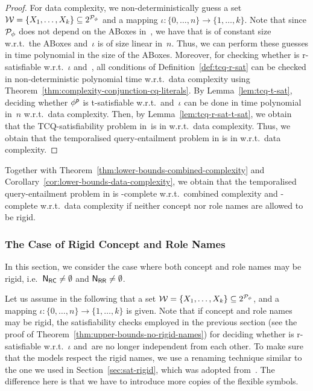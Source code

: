 \begin{proof}
    For data complexity, we non-deterministically guess a set
    $\mathcal{W}=\{X_1,\dots,X_k\}\subseteq 2^{\mathcal{P}_\phi}$ and a mapping
    $\iota\colon\{0,\dots,n\}\to\{1,\dots,k\}$.  Note that since $\mathcal{P}_\phi$
    does not depend on the ABoxes in~\Kmc, we have that \Wmc is of constant size
    w.r.t.\ the ABoxes and~$\iota$ is of size linear in~$n$.  Thus, we can
    perform these guesses in time polynomial in the size of the ABoxes.
    Moreover, for checking whether \Wmc is r-satisfiable w.r.t.~$\iota$
    and~\Kmc, all conditions of Definition~\ref{def:tcq-r-sat} can be checked in
    non-deterministic polynomial time w.r.t.\ data complexity using
    Theorem~\ref{thm:complexity-conjunction-cq-literals}.
    By Lemma~\ref{lem:tcq-t-sat}, deciding whether $\phi^\mathsf{p}$ is t-satisfiable
    w.r.t.~\Wmc and~$\iota$ can be done in time polynomial in~$n$ w.r.t.\ data
    complexity.
    Then, by Lemma~\ref{lem:tcq-r-sat-t-sat}, we obtain that the
    TCQ-satisfiability problem in~\SHQ is in \NP w.r.t.\ data complexity.  Thus,
    we obtain that the temporalised query-entailment problem in \SHQ is in \coNP
    w.r.t.\ data complexity.
\end{proof}

\noindent
Together with Theorem~\ref{thm:lower-bounds-combined-complexity} and
Corollary~\ref{cor:lower-bounds-data-complexity}, we obtain that the
temporalised query-entailment problem in \SHQ is \ExpTime-complete w.r.t.\
combined complexity and \coNP-complete w.r.t.\ data complexity if neither
concept nor role names are allowed to be rigid.


\subsubsection{The Case of Rigid Concept and Role Names}

In this section, we consider the case where both concept and role names may be
rigid, i.e.~$\mathsf{N_{RC}}\ne\emptyset$ and $\mathsf{N_{RR}}\ne\emptyset$.

Let us assume in the following that a set
$\mathcal{W}=\{X_1,\dots,X_k\}\subseteq 2^{\mathcal{P}_\phi}$, and a mapping
$\iota\colon\{0,\dots,n\}\to\{1,\dots,k\}$ is given.
%
Note that if concept and role names may be rigid, the satisfiability checks
employed in the previous section (see the proof of
Theorem~\ref{thm:upper-bounds-no-rigid-names}) for deciding whether \Wmc is
r-satisfiable w.r.t.~$\iota$ and~\Kmc are no longer independent from each other.
To make sure that the models respect the rigid names, we use a renaming
technique similar to the one we used in Section~\ref{sec:sat-rigid}, which was
adopted from~\cite{BaGL-ToCL12}.  The difference here is that we have to
introduce more copies of the flexible symbols.

